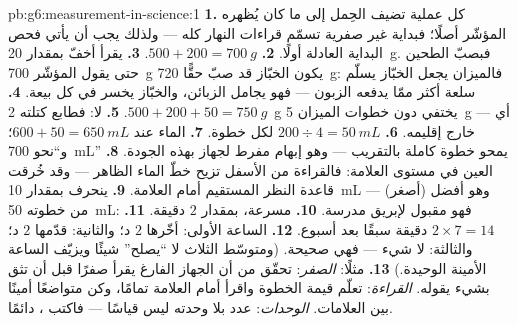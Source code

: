 \begin{solution}{pb:g6:measurement-in-science:1}
\textbf{1.} كل عملية  تضيف الحِمل إلى ما كان يُظهره المؤشّر
أصلًا؛ فبداية غير صفرية تسمّم قراءات النهار كله --- ولذلك يجب
أن يأتي فحص البداية العادلة أولًا.
\textbf{2.} $500 + 200 = \qty{700}{g}$.
\textbf{3.} يقرأ أخفّ بمقدار \qty{20}{g}. فبصبّ الطحين حتى يقول
المؤشّر \qty{700}{g} يكون الخبّاز قد صبّ حقًّا \qty{720}{g}:
فالميزان يجعل الخبّاز يسلّم سلعة أكثر ممّا يدفعه الزبون ---
فهو يجامل الزبائن، والخبّاز يخسر في كل بيعة.
\textbf{4.} $500 + 200 + 50 = \qty{750}{g}$.
\textbf{5.} لا: فطابع كتلته \qty{2}{g} يختفي دون خطوات الميزان
\qty{5}{g} --- أي خارج إقليمه.
\textbf{6.} $200 \div 4 = \qty{50}{mL}$ لكل خطوة.
\textbf{7.} الماء عند $600 + 50 = \qty{650}{mL}$؛ و``نحو
\qty{700}{mL}'' يمحو خطوة كاملة بالتقريب --- وهو إبهام مفرط
لجهاز بهذه الجودة.
\textbf{8.} العين في مستوى العلامة: فالقراءة من الأسفل تزيح خطّ
الماء الظاهر --- وقد خُرقت قاعدة النظر المستقيم أمام
العلامة.
\textbf{9.} ينحرف بمقدار \qty{10}{mL} --- وهو أفضل (أصغر) من
خطوته \qty{50}{mL}: فهو مقبول لإبريق مدرسة.
\textbf{10.} مسرعة، بمقدار $2$ دقيقة.
\textbf{11.} $2 \times 7 = 14$ دقيقة سبقًا بعد أسبوع.
\textbf{12.} الساعة الأولى: أخّرها $2$ د؛ والثانية: قدّمها $2$
د؛ والثالثة: لا شيء --- فهي صحيحة. (ومتوسّط الثلاث لا ``يصلح''
شيئًا ويزيّف الساعة الأمينة الوحيدة.)
\textbf{13.} مثلًا: \emph{الصفر}: تحقّق من أن الجهاز الفارغ
يقرأ صفرًا قبل أن تثق بشيء يقوله. \emph{القراءة}: تعلّم قيمة
الخطوة واقرأ أمام العلامة تمامًا، وكن متواضعًا أمينًا بين
العلامات. \emph{الوحدات}: عدد بلا وحدته ليس قياسًا --- فاكتب
، دائمًا.
\end{solution}
